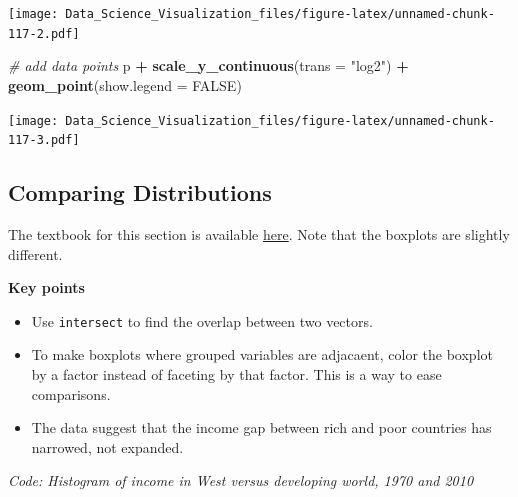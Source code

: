 \documentclass[
]{article}
\newenvironment{Shaded}{\begin{snugshade}}{\end{snugshade}}
\newcommand{\CommentTok}[1]{\textcolor[rgb]{0.56,0.35,0.01}{\textit{#1}}}
\newcommand{\DataTypeTok}[1]{\textcolor[rgb]{0.13,0.29,0.53}{#1}}
\newcommand{\KeywordTok}[1]{\textcolor[rgb]{0.13,0.29,0.53}{\textbf{#1}}}
\newcommand{\NormalTok}[1]{#1}
\newcommand{\OperatorTok}[1]{\textcolor[rgb]{0.81,0.36,0.00}{\textbf{#1}}}
\newcommand{\OtherTok}[1]{\textcolor[rgb]{0.56,0.35,0.01}{#1}}
\newcommand{\StringTok}[1]{\textcolor[rgb]{0.31,0.60,0.02}{#1}}
\providecommand{\tightlist}{%
  \setlength{\itemsep}{0pt}\setlength{\parskip}{0pt}}
\begin{document}
\texttt{[image: Data\_Science\_Visualization\_files/figure-latex/unnamed-chunk-117-2.pdf]}

\begin{Shaded}
\begin{Highlighting}[]
\CommentTok{# add data points}
\NormalTok{p }\OperatorTok{+}\StringTok{ }\KeywordTok{scale_y_continuous}\NormalTok{(}\DataTypeTok{trans =} \StringTok{"log2"}\NormalTok{) }\OperatorTok{+}\StringTok{ }\KeywordTok{geom_point}\NormalTok{(}\DataTypeTok{show.legend =} \OtherTok{FALSE}\NormalTok{)}
\end{Highlighting}
\end{Shaded}

\texttt{[image: Data\_Science\_Visualization\_files/figure-latex/unnamed-chunk-117-3.pdf]}

\hypertarget{comparing-distributions}{%
\subsection{Comparing Distributions}\label{comparing-distributions}}

The textbook for this section is available
\href{https://rafalab.github.io/dsbook/gapminder.html\#example-1970-versus-2010-income-distributions}{here}.
Note that the boxplots are slightly different.

\textbf{Key points}

\begin{itemize}
\tightlist
\item
  Use \texttt{intersect} to find the overlap between two vectors.
\item
  To make boxplots where grouped variables are adjacaent, color the
  boxplot by a factor instead of faceting by that factor. This is a way
  to ease comparisons.
\item
  The data suggest that the income gap between rich and poor countries
  has narrowed, not expanded.
\end{itemize}

\emph{Code: Histogram of income in West versus developing world, 1970
and 2010}
\end{document}
